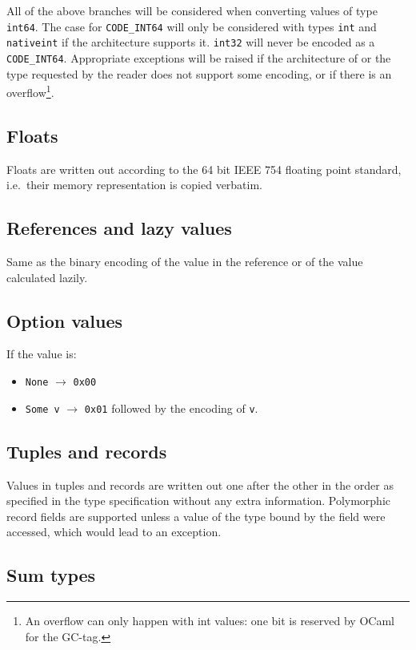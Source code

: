 \documentclass[12pt]{article}
\begin{document}
All of the above branches will be considered when converting values
of type \verb=int64=.  The case for \verb=CODE_INT64= will only be
considered with types \verb=int= and \verb=nativeint= if the architecture
supports it.  \verb=int32= will never be encoded as a \verb=CODE_INT64=.
Appropriate exceptions will be raised if the architecture of or the type
requested by the reader does not support some encoding, or if there
is an overflow\footnote{An overflow can only happen with int values:
one bit is reserved by OCaml for the GC-tag.}.

\subsection{Floats}

Floats are written out according to the 64 bit IEEE 754 floating point
standard, i.e.\ their memory representation is copied verbatim.

\subsection{References and lazy values}

Same as the binary encoding of the value in the reference or of the
value calculated lazily.

\subsection{Option values}

If the value is:

\begin{itemize}
\item \verb=None= $\rightarrow$ \verb=0x00=
\item \verb=Some v= $\rightarrow$ \verb=0x01= followed by the encoding of \verb=v=.
\end{itemize}

\subsection{Tuples and records}

Values in tuples and records are written out one after the other in
the order as specified in the type specification without any extra
information.  Polymorphic record fields are supported unless a value
of the type bound by the field were accessed, which would lead to an
exception.

\subsection{Sum types}
\end{document}
